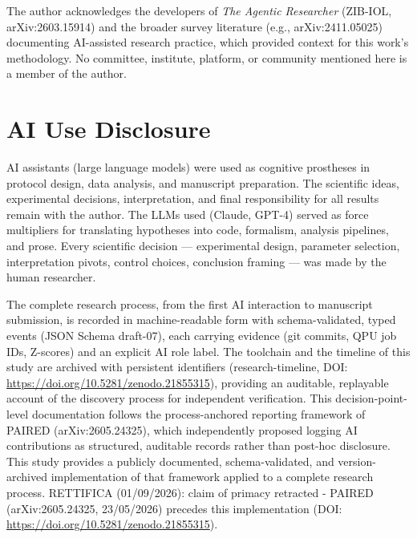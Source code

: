 \documentclass[12pt,a4paper]{article}
\begin{document}
The author acknowledges the developers of \textit{The Agentic Researcher} (ZIB-IOL, arXiv:2603.15914) and the broader survey literature (e.g., arXiv:2411.05025) documenting AI-assisted research practice, which provided context for this work's methodology. No committee, institute, platform, or community mentioned here is a member of the author.

\section*{AI Use Disclosure}

AI assistants (large language models) were used as cognitive prostheses in protocol design, data analysis, and manuscript preparation. The scientific ideas, experimental decisions, interpretation, and final responsibility for all results remain with the author. The LLMs used (Claude, GPT-4) served as force multipliers for translating hypotheses into code, formalism, analysis pipelines, and prose. Every scientific decision --- experimental design, parameter selection, interpretation pivots, control choices, conclusion framing --- was made by the human researcher.

The complete research process, from the first AI interaction to manuscript submission, is recorded in machine-readable form with schema-validated, typed events (JSON Schema draft-07), each carrying evidence (git commits, QPU job IDs, Z-scores) and an explicit AI role label. The toolchain and the timeline of this study are archived with persistent identifiers (research-timeline, DOI: \url{https://doi.org/10.5281/zenodo.21855315}), providing an auditable, replayable account of the discovery process for independent verification. This decision-point-level documentation follows the process-anchored reporting framework of PAIRED (arXiv:2605.24325), which independently proposed logging AI contributions as structured, auditable records rather than post-hoc disclosure. This study provides a publicly documented, schema-validated, and version-archived implementation of that framework applied to a complete research process. RETTIFICA (01/09/2026): claim of primacy retracted - PAIRED (arXiv:2605.24325, 23/05/2026) precedes this implementation (DOI: \url{https://doi.org/10.5281/zenodo.21855315}).
\end{document}

